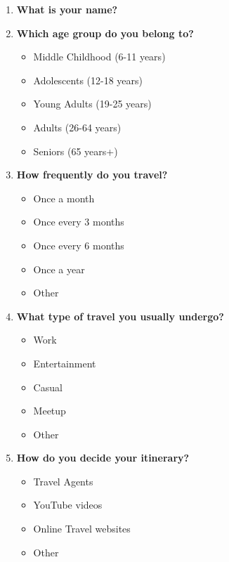 \documentclass[final,1p,times]{elsarticle}
\begin{document}
    \begin{enumerate}
        \item \textbf{What is your name?}

        \item \textbf{Which age group do you belong to?}
        \begin{itemize}
            \item Middle Childhood (6-11 years)
            \item Adolescents (12-18 years)
            \item Young Adults (19-25 years)
            \item Adults (26-64 years)
            \item Seniors (65 years+)
        \end{itemize}

        \item \textbf{How frequently do you travel?}
        \begin{itemize}
            \item Once a month
            \item Once every 3 months
            \item Once every 6 months
            \item Once a year
            \item Other
        \end{itemize}

        \item \textbf{What type of travel you usually undergo?}
        \begin{itemize}
            \item Work
            \item Entertainment
            \item Casual
            \item Meetup
            \item Other
        \end{itemize}

        \item \textbf{How do you decide your itinerary?}
        \begin{itemize}
            \item Travel Agents
            \item YouTube videos
            \item Online Travel websites
            \item Other
        \end{itemize}


\end{enumerate}
\end{document}
